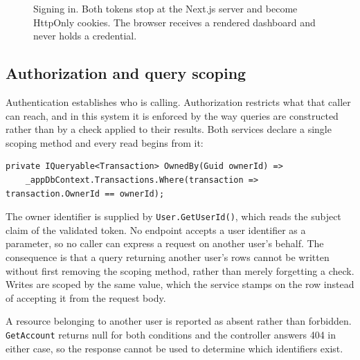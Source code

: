 \documentclass[11pt,a4paper]{article}
\newcommand{\msg}[4]{\draw[sqmsg] (#1,#3) -- (#2,#3) node[sqlab]{#4};}
\newcommand{\ret}[4]{\draw[sqret] (#1,#3) -- (#2,#3) node[sqlab]{#4};}
\newcommand{\selfmsg}[3]{%
  \draw[sqmsg] (#1,#2) -- (#1+0.38,#2) -- (#1+0.38,#2-0.3) -- (#1,#2-0.3);
  \node[sqfree,anchor=west] at (#1+0.48,#2-0.15) {#3};}
\newcommand{\code}[1]{\texttt{\fontsize{8.6}{10}\selectfont #1}}
\begin{document}
\begin{figure}[H]
\caption{Signing in. Both tokens stop at the Next.js server and become HttpOnly
cookies. The browser receives a rendered dashboard and never holds a credential.}
\label{fig:signin}
\end{figure}

\subsection{Authorization and query scoping}\label{sec:authz}

Authentication establishes who is calling. Authorization restricts what that
caller can reach, and in this system it is enforced by the way queries are
constructed rather than by a check applied to their results. Both services
declare a single scoping method and every read begins from it:

\begin{lstlisting}
private IQueryable<Transaction> OwnedBy(Guid ownerId) =>
    _appDbContext.Transactions.Where(transaction => transaction.OwnerId == ownerId);
\end{lstlisting}

The owner identifier is supplied by \code{User.GetUserId()}, which reads the
subject claim of the validated token. No endpoint accepts a user identifier as
a parameter, so no caller can express a request on another user's behalf. The
consequence is that a query returning another user's rows cannot be written
without first removing the scoping method, rather than merely forgetting a
check. Writes are scoped by the same value, which the service stamps on the row
instead of accepting it from the request body.

A resource belonging to another user is reported as absent rather than
forbidden. \code{GetAccount} returns null for both conditions and the
controller answers 404 in either case, so the response cannot be used to
determine which identifiers exist.
\end{document}
